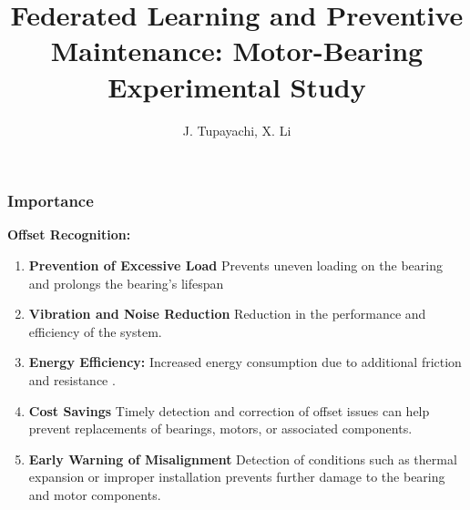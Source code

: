 \documentclass[9pt]{beamer}
\title[Federated Learning RUL]{Federated Learning and Preventive Maintenance:
Motor-Bearing Experimental Study  }
\author{J. Tupayachi, X. Li}
\begin{document}
\begin{frame}
\titlepage
\end{frame}


\begin{frame}
\frametitle{Importance}


\textbf{Offset Recognition:}
\begin{enumerate}
    \item \textbf{Prevention of Excessive Load} Prevents uneven loading on the bearing and prolongs the bearing's lifespan
    \item \textbf{Vibration and Noise Reduction} Reduction in the performance and efficiency of the system.
    \item \textbf{Energy Efficiency:} Increased energy consumption due to additional friction and resistance .
    \item \textbf{Cost Savings} Timely detection and correction of offset issues can help prevent replacements of bearings, motors, or associated components.
    \item \textbf{Early Warning of Misalignment} Detection of conditions such as thermal expansion or improper installation prevents further damage to the bearing and motor components.



\end{enumerate}
 
\end{frame}
\end{document}
